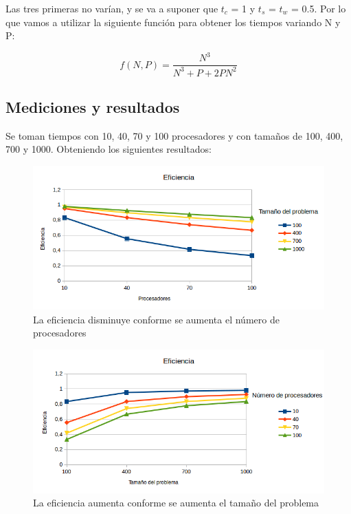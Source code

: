 Las tres primeras no varían, y se va a suponer que $t_{c}$ = 1 y $t_{s}$ = $t_{w}$ = 0.5. Por lo que vamos a utilizar la siguiente función para obtener los tiempos variando N y P:

\begin{equation}
	f(N,P) = \dfrac{N^{3}}{N^{3} + P + 2PN^{2}}
\end{equation}

\subsection{Mediciones y resultados}

Se toman tiempos con 10, 40, 70 y 100 procesadores y con tamaños de 100, 400, 700 y 1000. Obteniendo los siguientes resultados:

\begin{figure}[H]
	\centering
	\includegraphics[width=14cm]{imagenes/grafico1}
	\caption{La eficiencia disminuye conforme se aumenta el número de procesadores}
	\label{fig:grafico1}
\end{figure}


\begin{figure}[H]
	\centering
	\includegraphics[width=14cm]{imagenes/grafico2}
	\caption{La eficiencia aumenta conforme se aumenta el tamaño del problema}
	\label{fig:grafico2}
\end{figure}

